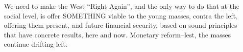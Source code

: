 \begin{footnotesize}
\begin{sffamily}
We need to make the West ``Right Again'', and the only way to do that at the social level, is offer SOMETHING viable to the young masses, contra the left, offering them present, and future financial security, based on sound principles that have concrete results, here and now. Monetary reform--lest, the masses continue drifting left.

\hfill

\end{sffamily}
\end{footnotesize}

